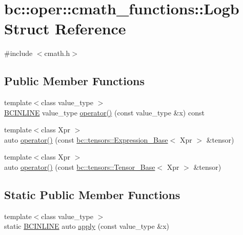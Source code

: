 \hypertarget{structbc_1_1oper_1_1cmath__functions_1_1Logb}{}\section{bc\+:\+:oper\+:\+:cmath\+\_\+functions\+:\+:Logb Struct Reference}
\label{structbc_1_1oper_1_1cmath__functions_1_1Logb}


{\ttfamily \#include $<$cmath.\+h$>$}

\subsection*{Public Member Functions}
\begin{DoxyCompactItemize}
\item 
{\footnotesize template$<$class value\+\_\+type $>$ }\\\hyperlink{common_8h_a6699e8b0449da5c0fafb878e59c1d4b1}{B\+C\+I\+N\+L\+I\+NE} value\+\_\+type \hyperlink{structbc_1_1oper_1_1cmath__functions_1_1Logb_ab420a371e8cfaf82ec0c83ba3fd497c1}{operator()} (const value\+\_\+type \&x) const
\item 
{\footnotesize template$<$class Xpr $>$ }\\auto \hyperlink{structbc_1_1oper_1_1cmath__functions_1_1Logb_ad213e9ec5c4ab1410951b509175caa90}{operator()} (const \hyperlink{classbc_1_1tensors_1_1Expression__Base}{bc\+::tensors\+::\+Expression\+\_\+\+Base}$<$ Xpr $>$ \&tensor)
\item 
{\footnotesize template$<$class Xpr $>$ }\\auto \hyperlink{structbc_1_1oper_1_1cmath__functions_1_1Logb_a1649ef9d7fae8c1151c011cc7b836973}{operator()} (const \hyperlink{classbc_1_1tensors_1_1Tensor__Base}{bc\+::tensors\+::\+Tensor\+\_\+\+Base}$<$ Xpr $>$ \&tensor)
\end{DoxyCompactItemize}
\subsection*{Static Public Member Functions}
\begin{DoxyCompactItemize}
\item 
{\footnotesize template$<$class value\+\_\+type $>$ }\\static \hyperlink{common_8h_a6699e8b0449da5c0fafb878e59c1d4b1}{B\+C\+I\+N\+L\+I\+NE} auto \hyperlink{structbc_1_1oper_1_1cmath__functions_1_1Logb_afc919b9959a9e4eb8d154d369a86fc50}{apply} (const value\+\_\+type \&x)
\end{DoxyCompactItemize}


